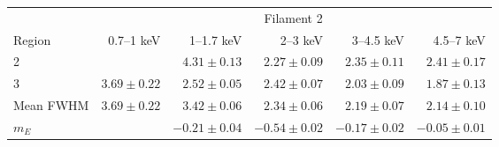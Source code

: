 \begin{tabular}{@{}lrrrrr@{}}
\toprule
{} & \multicolumn{5}{c}{Filament 2} \\
\cmidrule(l){2-6}
Region & 0.7--1 keV & 1--1.7 keV & 2--3 keV & 3--4.5 keV & 4.5--7 keV \\
\midrule
2         & {}            & $4.31\pm0.13$ & $2.27\pm0.09$ & $2.35\pm0.11$ & $2.41\pm0.17$\\
3         & $3.69\pm0.22$ & $2.52\pm0.05$ & $2.42\pm0.07$ & $2.03\pm0.09$ & $1.87\pm0.13$\\
Mean FWHM & $3.69\pm0.22$ & $3.42\pm0.06$ & $2.34\pm0.06$ & $2.19\pm0.07$ & $2.14\pm0.10$\\
$m_E$     & {}            & $-0.21\pm0.04$& $-0.54\pm0.02$& $-0.17\pm0.02$& $-0.05\pm0.01$\\
\bottomrule
\end{tabular} 
